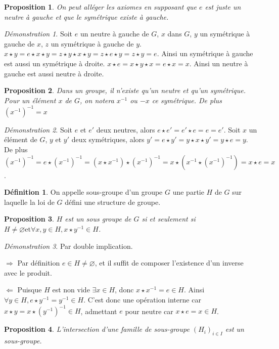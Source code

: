 \documentclass[a4paper, 11pt, french]{book}
\newenvironment{itemise}{\itemize}{\enditemize}
\theoremstyle{plain} %
\newtheorem{proposition}{Proposition}
\theoremstyle{definition} %
\newtheorem{definition}{Définition}
\theoremstyle{remark} %
\newtheorem*{demonstration}{Démonstration}
\newcommand{\1}{\mathds{1}}
\newcommand\vide{\varnothing}
\newcommand{\inv}[1]{#1^{-1}}
\newcommand{\et}{\mathrel{\mathrm{et}}}
\newcommand\equivalence[3]{
	\begin{demonstration}
		#1
		\begin{itemise}
			\item[$\Longrightarrow$] #2
			\item[$\Longleftarrow$] #3
		\end{itemise}
	\end{demonstration}
}
\begin{document}
\begin{proposition}
	On peut alléger les axiomes en supposant que $e$ est juste un neutre à gauche et que le symétrique existe à gauche.
\end{proposition}

\begin{demonstration}
	Soit $e$ un neutre à gauche de $G$, $x$ dans $G$, $y$ un symétrique à gauche de $x$, $z$ un symétrique à gauche de $y$.
	$x\star y=e\star x\star y=z\star y\star x\star y=z\star e\star y=z\star y=e$.
	Ainsi un symétrique à gauche est aussi un symétrique à droite.
	$x\star e=x\star y\star x=e\star x=x$.
	Ainsi un neutre à gauche est aussi neutre à droite.
\end{demonstration}

\begin{proposition}
	Dans un groupe, il n'existe qu'un neutre et qu'un symétrique.
	Pour un élément $x$ de $G$, on notera $ \inv{x}$ ou $-x$ ce symétrique.
	De plus $\inv{(\inv{x})}=x$
\end{proposition}

\begin{demonstration}
	Soit $e$ et $e'$ deux neutres, alors $e\star e'=e'\star e=e=e'$.
	Soit $x$ un élément de $G$, $y$ et $y'$ deux symétriques, alors $y'=e\star y'=y\star x\star y'=y\star e=y$.
	De plus $\inv{(\inv{x})}=e\star\inv{(\inv{x})}=(x\star \inv{x})\star\inv{(\inv{x})}=x\star(\inv{x}\star\inv{(\inv{x})})=x\star e=x$.
\end{demonstration}

\begin{definition}
	On appelle sous-groupe d'un groupe $G$ une partie $H$ de $G$ sur laquelle la loi de $G$ défini une structure de groupe.
\end{definition}

\begin{proposition}
	$H$ est un sous groupe de $G$ si et seulement si $H\neq\vide\et\forall x, y\in H, x\star\inv{y}\in H$.
\end{proposition}

\equivalence{Par double implication.}
{
	Par définition $e\in H\neq\vide$, et il suffit de composer l'existence d'un inverse avec le produit.
}{
	Puisque $H$ est non vide $\exists x\in H$, donc $x\star \inv{x}=e\in H$.
	Ainsi $\forall y\in H, e\star\inv{y}=\inv{y}\in H$.
	C'est donc une opération interne car $x\star y=x\star\inv{(\inv{y})}\in H$, admettant $e$ pour neutre car $x\star e=x\in H$.
}

\begin{proposition}
	L'intersection d'une famille de sous-groupe $(H_i)_{i\in I}$ est un sous-groupe.
\end{proposition}
\end{document}

